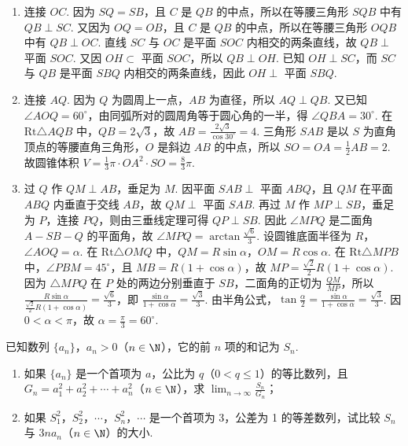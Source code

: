 \begin{solution}

\begin{enumerate}
    \item 连接 \(OC\). 因为 \(SQ = SB\)，且 \(C\) 是 \(QB\) 的中点，所以在等腰三角形 \(SQB\) 中有 \(QB \perp SC\). 又因为 \(OQ = OB\)，且 \(C\) 是 \(QB\) 的中点，所以在等腰三角形 \(OQB\) 中有 \(QB \perp OC\). 直线 \(SC\) 与 \(OC\) 是平面 \(SOC\) 内相交的两条直线，故 \(QB \perp\) 平面 \(SOC\). 又因 \(OH\subset\) 平面 \(SOC\)，所以 \(QB\perp OH\). 已知 \(OH\perp SC\)，而 \(SC\) 与 \(QB\) 是平面 \(SBQ\) 内相交的两条直线，因此 \(OH\perp\) 平面 \(SBQ\).

    \item 连接 \(AQ\). 因为 \(Q\) 为圆周上一点，\(AB\) 为直径，所以 \(AQ\perp QB\). 又已知 \(\angle AOQ=60^{\circ}\)，由同弧所对的圆周角等于圆心角的一半，得 \(\angle QBA=30^{\circ}\). 在 \(\mathrm{Rt}\triangle AQB\) 中，\(QB=2\sqrt{3}\)，故 \(AB=\frac{2\sqrt{3}}{\cos30^{\circ}}=4\). 三角形 \(SAB\) 是以 \(S\) 为直角顶点的等腰直角三角形，\(O\) 是斜边 \(AB\) 的中点，所以 \(SO=OA=\frac{1}{2}AB=2\). 故圆锥体积 \(V=\frac{1}{3}\pi\cdot OA^2\cdot SO=\frac{8}{3}\pi\).

    \item 过 \(Q\) 作 \(QM\perp AB\)，垂足为 \(M\). 因平面 \(SAB\perp\) 平面 \(ABQ\)，且 \(QM\) 在平面 \(ABQ\) 内垂直于交线 \(AB\)，故 \(QM\perp\) 平面 \(SAB\). 再过 \(M\) 作 \(MP\perp SB\)，垂足为 \(P\)，连接 \(PQ\)，则由三垂线定理可得 \(QP\perp SB\). 因此 \(\angle MPQ\) 是二面角 \(A-SB-Q\) 的平面角，故 \(\angle MPQ=\arctan\frac{\sqrt{6}}{3}\). 设圆锥底面半径为 \(R\)，\(\angle AOQ=\alpha\). 在 \(\mathrm{Rt}\triangle OMQ\) 中，\(QM=R\sin\alpha\)，\(OM=R\cos\alpha\). 在 \(\mathrm{Rt}\triangle MPB\) 中，\(\angle PBM=45^{\circ}\)，且 \(MB=R(1+\cos\alpha)\)，故 \(MP=\frac{\sqrt{2}}{2}R(1+\cos\alpha)\). 因为 \(\triangle MPQ\) 在 \(P\) 处的两边分别垂直于 \(SB\)，二面角的正切为 \(\frac{QM}{MP}\)，所以 \(\frac{R\sin\alpha}{\frac{\sqrt{2}}{2}R(1+\cos\alpha)}=\frac{\sqrt{6}}{3}\)，即 \(\frac{\sin\alpha}{1+\cos\alpha}=\frac{\sqrt{3}}{3}\). 由半角公式，\(\tan\frac{\alpha}{2}=\frac{\sin\alpha}{1+\cos\alpha}=\frac{\sqrt{3}}{3}\). 因 \(0<\alpha<\pi\)，故 \(\alpha=\frac{\pi}{3}=60^{\circ}\).
\end{enumerate}
\end{solution}

\begin{problem}
已知数列 \(\{a_n\}\)，\(a_n > 0\)（\(n \in \N\)），它的前 \(n\) 项的和记为 \(S_n\).

\begin{enumerate}
\item 如果 \(\{a_n\}\) 是一个首项为 \(a\)，公比为 \(q\)（\(0 < q \leqslant 1\)）的等比数列，且 \(G_n = a_1^2 + a_2^2 + \cdots + a_n^2\)（\(n \in \N\)），求 \(\displaystyle\lim_{n \to \infty} \frac{S_n}{G_n}\)；
\item 如果 \(S_1^2\)，\(S_2^2\)，\(\cdots\)，\(S_n^2\)，\(\cdots\) 是一个首项为 3，公差为 1 的等差数列，试比较 \(S_n\) 与 \(3na_n\)（\(n \in \N\)）的大小.
\end{enumerate}
\end{problem}

